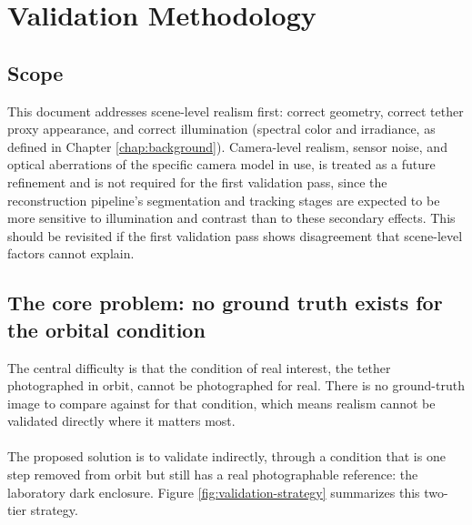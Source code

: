 \chapter{Validation Methodology}
\label{chap:methodology}

\section{Scope}
\label{sec:methodology-scope}

This document addresses scene-level realism first: correct geometry, correct tether proxy appearance, and correct illumination (spectral color and irradiance, as defined in Chapter \ref{chap:background}). Camera-level realism, sensor noise, and optical aberrations of the specific camera model in use, is treated as a future refinement and is not required for the first validation pass, since the reconstruction pipeline's segmentation and tracking stages are expected to be more sensitive to illumination and contrast than to these secondary effects. This should be revisited if the first validation pass shows disagreement that scene-level factors cannot explain.

\section{The core problem: no ground truth exists for the orbital condition}

The central difficulty is that the condition of real interest, the tether photographed in orbit, cannot be photographed for real. There is no ground-truth image to compare against for that condition, which means realism cannot be validated directly where it matters most.
\\\\
The proposed solution is to validate indirectly, through a condition that is one step removed from orbit but still has a real photographable reference: the laboratory dark enclosure. Figure \ref{fig:validation-strategy} summarizes this two-tier strategy.

